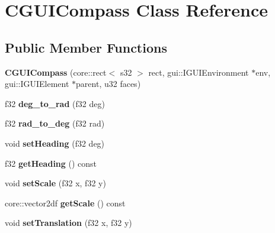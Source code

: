 \hypertarget{class_c_g_u_i_compass}{
\section{CGUICompass Class Reference}
\label{class_c_g_u_i_compass}
}
\subsection*{Public Member Functions}
\begin{DoxyCompactItemize}
\item 
\hypertarget{class_c_g_u_i_compass_af70a8ea4f3386c6d4a5566a210b3e344}{
{\bfseries CGUICompass} (core::rect$<$ s32 $>$ rect, gui::IGUIEnvironment $\ast$env, gui::IGUIElement $\ast$parent, u32 faces)}
\label{class_c_g_u_i_compass_af70a8ea4f3386c6d4a5566a210b3e344}

\item 
\hypertarget{class_c_g_u_i_compass_a00ce009badc9acccfe0015cf9d1ba4c4}{
f32 {\bfseries deg\_\-to\_\-rad} (f32 deg)}
\label{class_c_g_u_i_compass_a00ce009badc9acccfe0015cf9d1ba4c4}

\item 
\hypertarget{class_c_g_u_i_compass_a03784d7fb29677495ad1e7418c78ac26}{
f32 {\bfseries rad\_\-to\_\-deg} (f32 rad)}
\label{class_c_g_u_i_compass_a03784d7fb29677495ad1e7418c78ac26}

\item 
\hypertarget{class_c_g_u_i_compass_ac7ec9613c1b4ea098496a930e4ff60c2}{
void {\bfseries setHeading} (f32 deg)}
\label{class_c_g_u_i_compass_ac7ec9613c1b4ea098496a930e4ff60c2}

\item 
\hypertarget{class_c_g_u_i_compass_a66c9dabb84f924c48ca57a81ecd23f6a}{
f32 {\bfseries getHeading} () const }
\label{class_c_g_u_i_compass_a66c9dabb84f924c48ca57a81ecd23f6a}

\item 
\hypertarget{class_c_g_u_i_compass_a076bb35eb960d1f13b318ee7070e6605}{
void {\bfseries setScale} (f32 x, f32 y)}
\label{class_c_g_u_i_compass_a076bb35eb960d1f13b318ee7070e6605}

\item 
\hypertarget{class_c_g_u_i_compass_ac849532af0e70bbfeb613d3248d0e329}{
core::vector2df {\bfseries getScale} () const }
\label{class_c_g_u_i_compass_ac849532af0e70bbfeb613d3248d0e329}

\item 
\hypertarget{class_c_g_u_i_compass_a7ab068db25586afae96c8d726f53e37d}{
void {\bfseries setTranslation} (f32 x, f32 y)}
\label{class_c_g_u_i_compass_a7ab068db25586afae96c8d726f53e37d}


\end{DoxyCompactItemize}
